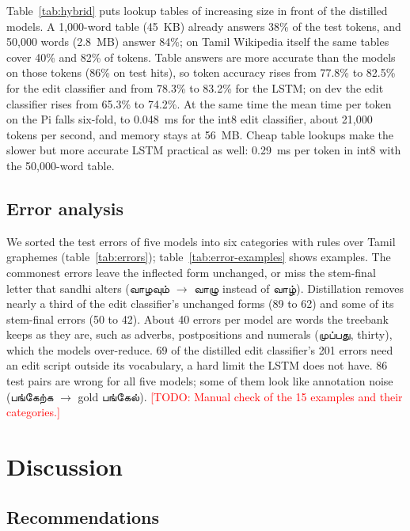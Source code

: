 \documentclass{sadhana}
\newcommand{\ta}[1]{{\tamilfont #1}}
\newcommand{\todo}[1]{\textcolor{red}{[TODO: #1]}}
\begin{document}
Table~\ref{tab:hybrid} puts lookup tables of increasing size in front of the
distilled models. A 1,000-word table (45~KB) already answers 38\% of the test
tokens, and 50,000 words (2.8~MB) answer 84\%; on Tamil Wikipedia itself the
same tables cover 40\% and 82\% of tokens. Table answers are more accurate than
the models on those tokens (86\% on test hits), so token accuracy rises from
77.8\% to 82.5\% for the edit classifier and from 78.3\% to 83.2\% for the
LSTM; on dev the edit classifier rises from 65.3\% to 74.2\%. At the same time
the mean time per token on the Pi falls six-fold, to 0.048~ms for the int8 edit
classifier, about 21,000 tokens per second, and memory stays at 56~MB. Cheap
table lookups make the slower but more accurate LSTM practical as well:
0.29~ms per token in int8 with the 50,000-word table.




\subsection{Error analysis}
\label{sec:errors}

We sorted the test errors of five models into six categories with rules over
Tamil graphemes (table~\ref{tab:errors}); table~\ref{tab:error-examples} shows
examples. The commonest errors leave the inflected form unchanged, or miss the
stem-final letter that sandhi alters (\ta{வாழவும்} $\rightarrow$ \ta{வாழு}
instead of \ta{வாழ்}). Distillation removes nearly a third of the edit
classifier's unchanged forms (89 to 62) and some of its stem-final errors (50
to 42). About 40 errors per model are words the treebank keeps as they are,
such as adverbs, postpositions and numerals (\ta{முப்பது}, thirty), which the
models over-reduce. 69 of the distilled edit classifier's 201 errors need an
edit script outside its vocabulary, a hard limit the LSTM does not have. 86
test pairs are wrong for all five models; some of them look like annotation
noise (\ta{பங்கேற்க} $\rightarrow$ gold \ta{பங்கேல்}).
\todo{Manual check of the 15 examples and their categories.}

\section{Discussion}
\label{sec:discussion}

\subsection{Recommendations}
\end{document}
